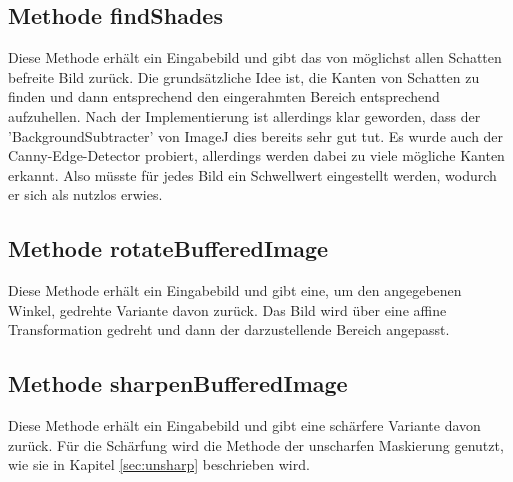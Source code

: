 \subsection*{Methode findShades}
Diese Methode erhält ein Eingabebild und gibt das von möglichst allen Schatten befreite Bild zurück.
Die grundsätzliche Idee ist, die Kanten von Schatten zu finden und dann entsprechend den eingerahmten Bereich entsprechend aufzuhellen.
Nach der Implementierung ist allerdings klar geworden, dass der 'BackgroundSubtracter' von ImageJ dies bereits sehr gut tut.
Es wurde auch der Canny-Edge-Detector probiert, allerdings werden dabei zu viele mögliche Kanten erkannt. Also müsste für jedes Bild ein Schwellwert eingestellt werden, wodurch er sich als nutzlos erwies.


%


\subsection*{Methode rotateBufferedImage}
Diese Methode erhält ein Eingabebild und gibt eine, um den angegebenen Winkel, gedrehte Variante davon zurück.
Das Bild wird über eine affine Transformation gedreht und dann der darzustellende Bereich angepasst.


\subsection*{Methode sharpenBufferedImage}
Diese Methode erhält ein Eingabebild und gibt eine schärfere Variante davon zurück.
Für die Schärfung wird die Methode der unscharfen Maskierung genutzt, wie sie in Kapitel \ref*{sec:unsharp} beschrieben wird.
